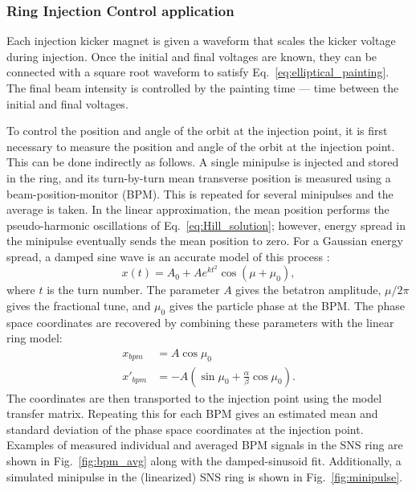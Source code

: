 \subsubsection{Ring Injection Control application}

Each injection kicker magnet is given a waveform that scales the kicker voltage during injection. Once the initial and final voltages are known, they can be connected with a square root waveform to satisfy Eq.~\eqref{eq:elliptical_painting}. The final beam intensity is controlled by the painting time — time between the initial and final voltages.

To control the position and angle of the orbit at the injection point, it is first necessary to measure the position and angle of the orbit at the injection point. This can be done indirectly as follows. A single minipulse is injected and stored in the ring, and its turn-by-turn mean transverse position is measured using a beam-position-monitor (BPM). This is repeated for several minipulses and the average is taken. In the linear approximation, the mean position performs the pseudo-harmonic oscillations of Eq.~\eqref{eq:Hill_solution}; however, energy spread in the minipulse eventually sends the mean position to zero. For a Gaussian energy spread, a damped sine wave is an accurate model of this process \cite{Pelaia2016}:
%
\begin{equation}\label{eq:damped_sinusoid}
    x(t) = A_0 + A e^{kt^2} \cos{\left(\mu + \mu_0\right)},
\end{equation}
%
where $t$ is the turn number. The parameter $A$ gives the betatron amplitude, $\mu / 2\pi$ gives the fractional tune, and $\mu_0$ gives the particle phase at the BPM. The phase space coordinates are recovered by combining these parameters with the linear ring model:
%
\begin{equation}
\begin{aligned}
    x_{bpm} &= A \cos\mu_0 \\ 
    x'_{bpm} &= -A\left({\sin\mu_0 + \frac{\alpha}{\beta}\cos\mu_0}\right).
\end{aligned}
\end{equation}
%
The coordinates are then transported to the injection point using the model transfer matrix. Repeating this for each BPM gives an estimated mean and standard deviation of the phase space coordinates at the injection point. Examples of measured individual and averaged BPM signals in the SNS ring are shown in Fig.~\ref{fig:bpm_avg} along with the damped-sinusoid fit. Additionally, a simulated minipulse in the (linearized) SNS ring is shown in Fig.~\ref{fig:minipulse}.
